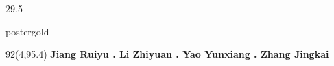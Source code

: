 \documentclass[hyperref={pdfpagelabels=false}]{beamer}
\newcommand{\sectiontitle}[1]{%
  {\fontsize{44}{49}\selectfont\bfseries\color{posterink}#1\par}%
}
\begin{document}
\begin{frame}
\begin{textblock}{29.5}
\begin{musicpanel}[height=19.0cm]{postergold}
  \end{musicpanel}
\end{textblock}

\newcommand{\disabledinvestmentpanel}{%
\begin{textblock}{38}(58,76.6)
  \begin{musicpanel}[height=9.6cm]{posterteal}
    \sectiontitle{Why invest now?}
    \vspace{.52cm}
    {\fontsize{31}{36}\selectfont\bfseries\color{posterpurple}Differentiated}\quad
    {\fontsize{27}{32}\selectfont Discovery beyond nearest-neighbor lists.\par}
    \vspace{.42cm}
    {\fontsize{31}{36}\selectfont\bfseries\color{posterblue}Measured}\quad
    {\fontsize{27}{32}\selectfont One million tracks, reproducible evidence.\par}
    \vspace{.42cm}
    {\fontsize{31}{36}\selectfont\bfseries\color{postergold}Ready to learn}\quad
    {\fontsize{27}{32}\selectfont Online listener feedback is next.\par}
  \end{musicpanel}
\end{textblock}
}

\begin{textblock}{92}(4,95.4)
  {\fontsize{25}{30}\selectfont\bfseries\color{posterink}
    Jiang Ruiyu . Li Zhiyuan . Yao Yunxiang . Zhang Jingkai}
\end{textblock}

\end{frame}
\end{document}
